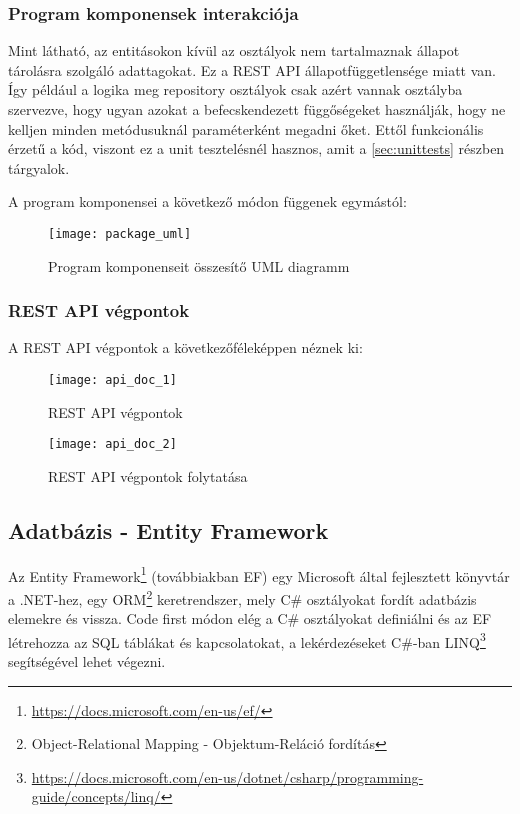 \clearpage

\subsubsection{Program komponensek interakciója}

Mint látható, az entitásokon kívül az osztályok nem tartalmaznak állapot tárolásra szolgáló adattagokat. Ez a REST API állapotfüggetlensége miatt van. Így például a logika meg repository osztályok csak azért vannak osztályba szervezve, hogy ugyan azokat a befecskendezett függőségeket használják, hogy ne kelljen minden metódusuknál paraméterként megadni őket. Ettől funkcionális érzetű a kód, viszont ez a unit tesztelésnél hasznos, amit a \ref{sec:unittests} részben tárgyalok.

A program komponensei a következő módon függenek egymástól:

\begin{figure}[H]
	\centering
	\texttt{[image: package\_uml]}
	\caption{Program komponenseit összesítő UML diagramm}
	\label{fig:package}
\end{figure}

\clearpage

\subsubsection{REST API végpontok}

A REST API végpontok a következőféleképpen néznek ki:

\begin{figure}[H]
	\centering
	\texttt{[image: api\_doc\_1]}
	\caption{REST API végpontok}
	\label{fig:apiDoc1}
\end{figure}

\begin{figure}[H]
	\centering
	\texttt{[image: api\_doc\_2]}
	\caption{REST API végpontok folytatása}
	\label{fig:apiDoc2}
\end{figure}

\subsection{Adatbázis - Entity Framework}
Az Entity Framework\footnote{\url{https://docs.microsoft.com/en-us/ef/}} (továbbiakban EF) egy Microsoft által fejlesztett könyvtár a .NET-hez, egy ORM\footnote{Object-Relational Mapping - Objektum-Reláció fordítás} keretrendszer, mely C\# osztályokat fordít adatbázis elemekre és vissza. Code first módon elég a C\# osztályokat definiálni és az EF létrehozza az SQL táblákat és kapcsolatokat, a lekérdezéseket C\#-ban LINQ\footnote{\url{https://docs.microsoft.com/en-us/dotnet/csharp/programming-guide/concepts/linq/}} segítségével lehet végezni.

